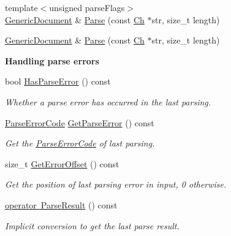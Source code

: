 \begin{Indent}
\begin{DoxyCompactItemize}
\item 
{\footnotesize template$<$unsigned parse\+Flags$>$ }\\\mbox{\hyperlink{classrapidjson_1_1_generic_document}{Generic\+Document}} \& \mbox{\hyperlink{classrapidjson_1_1_generic_document_aca5ed8f26946f49dc4b7b4143ea6398c}{Parse}} (const \mbox{\hyperlink{classrapidjson_1_1_generic_value_adcdbc7fa85a9a41b78966d7e0dcc2ac4}{Ch}} $\ast$str, size\+\_\+t length)
\item 
\mbox{\hyperlink{classrapidjson_1_1_generic_document}{Generic\+Document}} \& \mbox{\hyperlink{classrapidjson_1_1_generic_document_a0bdf1d5fc1f6305af484b0269d72a93e}{Parse}} (const \mbox{\hyperlink{classrapidjson_1_1_generic_value_adcdbc7fa85a9a41b78966d7e0dcc2ac4}{Ch}} $\ast$str, size\+\_\+t length)
\end{DoxyCompactItemize}
\end{Indent}
\begin{Indent}\textbf{ Handling parse errors}\par
\begin{DoxyCompactItemize}
\item 
bool \mbox{\hyperlink{classrapidjson_1_1_generic_document_a7607bb42b51547e44bfd4cab35d8f20e}{Has\+Parse\+Error}} () const
\begin{DoxyCompactList}\small\item\em Whether a parse error has occurred in the last parsing. \end{DoxyCompactList}\item 
\mbox{\hyperlink{group___r_a_p_i_d_j_s_o_n___e_r_r_o_r_s_ga7d3acf640886b1f2552dc8c4cd6dea60}{Parse\+Error\+Code}} \mbox{\hyperlink{classrapidjson_1_1_generic_document_ab94c280c079a6837a24951cb4d8f337b}{Get\+Parse\+Error}} () const
\begin{DoxyCompactList}\small\item\em Get the \mbox{\hyperlink{group___r_a_p_i_d_j_s_o_n___e_r_r_o_r_s_ga7d3acf640886b1f2552dc8c4cd6dea60}{Parse\+Error\+Code}} of last parsing. \end{DoxyCompactList}\item 
size\+\_\+t \mbox{\hyperlink{classrapidjson_1_1_generic_document_af532179ca5ad5434a5e8af63f5da4c5f}{Get\+Error\+Offset}} () const
\begin{DoxyCompactList}\small\item\em Get the position of last parsing error in input, 0 otherwise. \end{DoxyCompactList}\item 
\mbox{\hyperlink{classrapidjson_1_1_generic_document_a36d19989c9221b27036675455516a974}{operator Parse\+Result}} () const
\begin{DoxyCompactList}\small\item\em Implicit conversion to get the last parse result. \end{DoxyCompactList}\end{DoxyCompactItemize}
\end{Indent}

